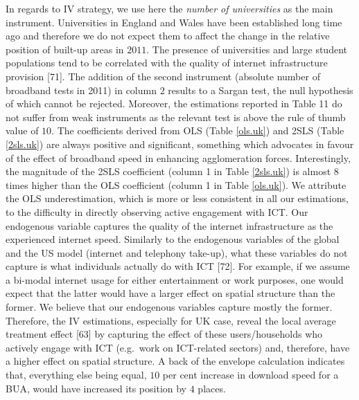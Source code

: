 \documentclass[10pt,letterpaper]{article}
\begin{document}
In regards to IV strategy, we use here the \emph{number of universities}
as the main instrument. Universities in England and Wales have been
established long time ago and therefore we do not expect them to affect
the change in the relative position of built-up areas in \(2011\).
\color{blue} The presence of universities and large student populations
tend to be correlated with the quality of internet infrastructure
provision {[}71{]}. \color{black} The addition of the second instrument
(absolute number of broadband tests in 2011) in column \(2\) results to
a Sargan test, the null hypothesis of which cannot be rejected.
Moreover, the estimations reported in Table 11 do not suffer from weak
instruments as the relevant test is above the rule of thumb value of
\(10\). \color{blue} The coefficients derived from OLS (Table
\ref{ols.uk}) and 2SLS (Table \ref{2sls.uk}) are always positive and
significant, something which advocates in favour of the effect of
broadband speed in enhancing agglomeration forces. Interestingly, the
magnitude of the 2SLS coefficient (column 1 in Table \ref{2sls.uk}) is
almost 8 times higher than the OLS coefficient (column 1 in Table
\ref{ols.uk}). We attribute the OLS underestimation, which is more or
less consistent in all our estimations, to the difficulty in directly
observing active engagement with ICT. Our endogenous variable captures
the quality of the internet infrastructure as the experienced internet
speed. Similarly to the endogenous variables of the global and the US
model (internet and telephony take-up), what these variables do not
capture is what individuals actually do with ICT {[}72{]}. For example,
if we assume a bi-modal internet usage for either entertainment or work
purposes, one would expect that the latter would have a larger effect on
spatial structure than the former. We believe that our endogenous
variables capture mostly the former. Therefore, the IV estimations,
especially for UK case, reveal the local average treatment effect
{[}63{]} by capturing the effect of these users/households who actively
engage with ICT (e.g.~work on ICT-related sectors) and, therefore, have
a higher effect on spatial structure. A back of the envelope calculation
indicates that, everything else being equal, \(10\) per cent increase in
download speed for a BUA, would have increased its position by \(4\)
places. \color{black}
\end{document}
